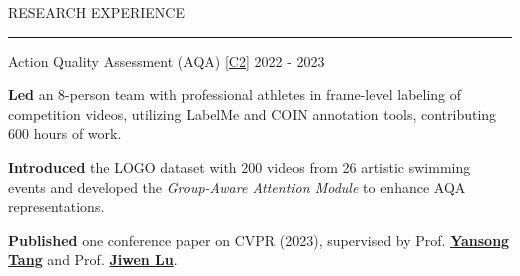 \documentclass{resume} %
\renewenvironment{rSection}[1]{
\sectionskip
\textcolor{TsinghuaPurple}{\MakeUppercase{#1}}
\sectionlineskip
\hrule
\begin{list}{}{
\setlength{\leftmargin}{0em}
}
\item[]
}{
\end{list}
}
\begin{document}
\begin{rSection}{RESEARCH EXPERIENCE}
\begin{rSubsection}{Action Quality Assessment (AQA)  \hyperref[c2]{[C2]}} {2022 - 2023}{}{}
    \item \textbf{Led} an 8-person team with professional athletes in frame-level labeling of competition videos, utilizing LabelMe and COIN annotation tools, contributing 600 hours of work.
    \item \textbf{Introduced} the LOGO dataset with 200 videos from 26 artistic swimming events and developed the \textit{Group-Aware Attention Module} to enhance AQA representations.
    \item \textbf{Published} one conference paper on CVPR (2023), supervised by Prof. \href{https://andytang15.github.io/}{\textbf{Yansong Tang}} and Prof. \href{https://ivg.au.tsinghua.edu.cn/Jiwen_Lu/experiences.html}{\textbf{Jiwen Lu}}.
\end{rSubsection}
\vspace{5pt}


\end{rSection}
\end{document}
